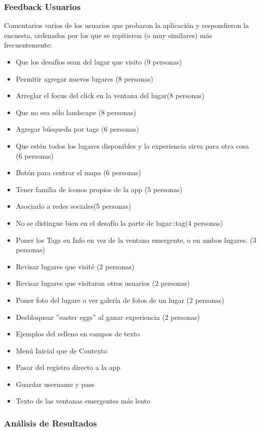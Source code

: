 \documentclass[10pt,letterpaper]{article}
\begin{document}
\subsubsection{Feedback Usuarios}

Comentarios varios de los usuarios que probaron la aplicación y respondieron la encuesta, ordenados por los que se repitieron (o muy similares) más frecuentemente:\\

\begin{itemize}
\item Que los desafíos sean del lugar que visito (9 personas)
\item Permitir agregar nuevos lugares (8 personas)
\item Arreglar el focus del click en la ventana del lugar(8 personas)
\item Que no sea sólo landscape (8 personas)
\item Agregar búsqueda por tags (6 personas)
\item Que estén todos los lugares disponibles y la experiencia sirva para otra cosa (6 personas)
\item Botón para centrar el mapa (6 personas)
\item Tener familia de íconos propios de la app (5 personas)
\item Asociarlo a redes sociales(5 personas)
\item No se distingue bien en el desafío la parte de lugar::tag(4 personas)
\item Poner los Tags en Info en vez de la ventana emergente, o en ambos lugares. (3 personas)
\item Revisar lugares que visité (2 personas)
\item Revisar lugares que visitaron otros usuarios (2 personas)
\item Poner foto del lugare o ver galería de fotos de un lugar (2 personas)
\item Desbloquear ''easter eggs'' al ganar experiencia (2 personas)
\item Ejemplos del relleno en campos de texto
\item Menú Inicial que de Contexto
\item Pasar del registro directo a la app
\item Guardar username y pass
\item Texto de las ventanas emergentes más lento
\end{itemize}

\subsubsection{Análisis de Resultados}
\end{document}
